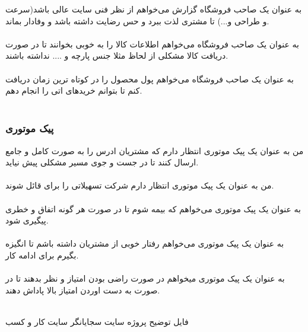 \documentclass[12pt,onecolumn,a4paper]{article}
\begin{document}
به عنوان یک صاحب فروشگاه گزارش می‌خواهم از نظر فنی سایت عالی باشد(سرعت و طراحی و...) تا مشتری لذت ببرد و حس رضایت داشته باشد و وفادار بماند.\\
\\


به عنوان یک صاحب فروشگاه می‌خواهم اطلاعات کالا را به خوبی بخوانند تا در صورت دریافت کالا مشکلی از لحاظ مثلا جنس پارچه و .... نداشته باشند.\\
\\


به عنوان یک صاحب فروشگاه می‌خواهم پول محصول را در کوتاه ترین زمان دریافت کنم تا بتوانم خریدهای اتی را انجام دهم.\\
\\










\subsubsection{پیک موتوری}

  من به عنوان یک پیک موتوری انتظار دارم که مشتریان ادرس را به صورت کامل و جامع ارسال کنند تا در جست و جوی مسیر مشکلی پیش نیاید.\\
  \\
  
  
من به عنوان یک پیک موتوری انتظار دارم شرکت تسهیلاتی را برای قائل شوند.\\
\\


به عنوان یک پیک موتوری می‌خواهم که بیمه شوم تا در صورت هر گونه اتفاق و خطری پیگیری شود.\\
\\


به عنوان یک پیک موتوری می‌خواهم رفتار خوبی از مشتریان داشته باشم تا انگیزه بگیرم برای ادامه کار.\\
\\


به عنوان یک پیک موتوری میخواهم در صورت راضی بودن امتیاز و نظر بدهند تا در صورت به دست اوردن امتیاز بالا پاداش دهند.\\
\\










\newpage
\begin{thebibliography}{99}
\bibitem{}
فایل توضیح پروژه
\bibitem{}
سایت سجایانگر
\bibitem{}
سایت کار و کسب


\end{thebibliography}
\end{document}

